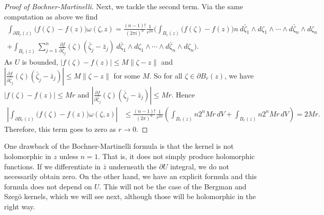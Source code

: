 \documentclass[12pt,openany]{book}
\newcommand{\snorm}[1]{\lVert {#1} \rVert}
\newcommand{\abs}[1]{\left\lvert {#1} \right\rvert}
\theoremstyle{plain}
\theoremstyle{remark}
\theoremstyle{definition}
\theoremstyle{exercise}
\theoremstyle{example}
\begin{document}
\begin{proof}[Proof of Bochner-Martinelli]
Next, we tackle the second term.
Via the same computation as above we find
\begin{multline*}
\int_{\partial B_r(z)}
\bigl(f(\zeta)-f(z)\bigr)
\omega(\zeta,z)
=
\frac{(n-1)!}{{(2\pi i)}^n}\frac{1}{r^{2n}}
\Biggl(
\int_{B_r(z)}
\bigl(f(\zeta)-f(z)\bigr)
n~
d\bar{\zeta}_1 \wedge d\zeta_1 \wedge
\cdots \wedge
d\bar{\zeta}_n \wedge d\zeta_n
\\
+
\int_{B_r(z)}
\sum_{j=1}^n
\frac{\partial f}{\partial \bar{\zeta}_j}(\zeta)
(\bar{\zeta}_j-\bar{z}_j)
~
d\bar{\zeta}_1 \wedge d\zeta_1 \wedge
\cdots \wedge
d\bar{\zeta}_n \wedge d\zeta_n \Biggr).
\end{multline*}
As $U$ is bounded, $\abs{f(\zeta)-f(z)} \leq M
\snorm{\zeta-z}$
and
$\abs{\frac{\partial f}{\partial \bar{\zeta}_j}(\zeta)
(\bar{\zeta}_j-\bar{z}_j)} \leq M \snorm{\zeta-z}$ for some $M$.
So 
for all $\zeta \in \partial B_r(z)$,
we have
$\abs{f(\zeta)-f(z)} \leq Mr$
and $\abs{\frac{\partial f}{\partial \bar{\zeta}_j}(\zeta)
(\bar{\zeta}_j-\bar{z}_j)} \leq Mr$.
Hence
\begin{equation*}
\begin{split}
\abs{
\int_{\partial B_r(z)}
\bigl(f(\zeta)-f(z)\bigr)
\omega(\zeta,z)
}
& \leq
\frac{(n-1)!}{{(2\pi)}^n}\frac{1}{r^{2n}}
\left(
\int_{B_r(z)}
n 2^n Mr \, dV
+
\int_{B_r(z)}
n 2^n Mr \, dV
\right)
=
2 M r .
\end{split}
\end{equation*}
Therefore, this term goes to zero as $r \to 0$.
\end{proof}

One drawback of the Bochner-Martinelli formula is that the kernel is not
holomorphic in $z$ unless $n=1$.  That is, it does not simply produce
holomorphic functions.  If we differentiate in $\bar{z}$ underneath the
$\partial U$ integral, we do not necessarily obtain zero.
On the other hand, we have an explicit formula and this formula does not
depend on $U$.  This will not be the case of the Bergman and Szeg\"o
kernels, which we will see next, although those will be holomorphic in the
right way.
\end{document}
